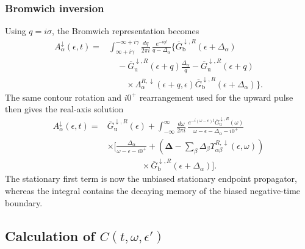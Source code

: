 \documentclass[
 reprint,
 superscriptaddress,
 amsmath,amssymb,
 aps,prb,
 longbibliography,
 floatfix
]{revtex4-2}
\begin{document}
\subsubsection{Bromwich inversion}

Using $q=i\sigma$, the Bromwich representation becomes
\begin{align*}
A_\alpha^\downarrow(\epsilon,t)
={}&
\int_{\infty+i\gamma}^{-\infty+i\gamma}
\frac{dq}{2\pi i}\,
\frac{e^{-iqt}}{q-\Delta_\alpha}
\Bigg\{
\overline G_{\mathrm b}^{\downarrow,R}
(\epsilon+\Delta_\alpha)
\\
&\quad-
\overline G_{\mathrm u}^{\downarrow,R}
(\epsilon+q)
\frac{\Delta_\alpha}{q}
-
\overline G_{\mathrm u}^{\downarrow,R}
(\epsilon+q)
\\
&\qquad\times
\Lambda_\alpha^{R,\downarrow}
(\epsilon+q,\epsilon)
\overline G_{\mathrm b}^{\downarrow,R}
(\epsilon+\Delta_\alpha)
\Bigg\}.
\end{align*}
The same contour rotation and $i0^+$ rearrangement used for the upward pulse then gives the real-axis solution
\begin{equation*}
\begin{aligned}
A_\alpha^\downarrow(\epsilon,t)
={}&
\overline G_{\mathrm u}^{\downarrow,R}
(\epsilon)
+
\int_{-\infty}^{\infty}
\frac{d\omega}{2\pi i}\,
\frac{
e^{-i(\omega-\epsilon)t}
\overline G_{\mathrm u}^{\downarrow,R}
(\omega)}
{\omega-\epsilon-\Delta_\alpha-i0^+}
\\
&\times
\Bigg[
\frac{\Delta_\alpha}
{\omega-\epsilon-i0^+}
+
\left(
\bm\Delta
-
\sum_\beta
\Delta_\beta
\Upsilon_{\alpha\beta}^{R,\downarrow}
(\epsilon,\omega)
\right)
\\
&\qquad\qquad\times
\overline G_{\mathrm b}^{\downarrow,R}
(\epsilon+\Delta_\alpha)
\Bigg].
\end{aligned}
\end{equation*}
The stationary first term is now the unbiased stationary endpoint propagator, whereas the integral contains the decaying memory of the biased negative-time boundary.

\subsection{Calculation of $C(t,\omega,\epsilon')$}
\label{sec:down-C}
\end{document}

